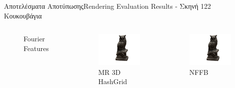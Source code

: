 \documentclass[10pt]{beamer}
\begin{document}
\begin{frame}{Αποτελέσματα Αποτύπωσης}{Rendering Evaluation Results - Σκηνή 122 Κουκουβάγια}
\begin{columns}[T]
\begin{figure}
                \caption{\tiny{Fourier Features}}
            \end{figure}
            \begin{figure}
                \includegraphics[height=.3\textheight, width=\linewidth, keepaspectratio]{images/chapter5_img/RenderingResults/MRHashGrid3D/eval_055.jpg}
                \caption{\tiny{MR 3D HashGrid}}
            \end{figure}
            \begin{figure}
                \includegraphics[height=.3\textheight, width=\linewidth, keepaspectratio]{images/chapter5_img/RenderingResults/NFFB/eval_055.jpg}
                \caption{\tiny{NFFB}}

\end{figure}
\end{columns}
\end{frame}
\end{document}
